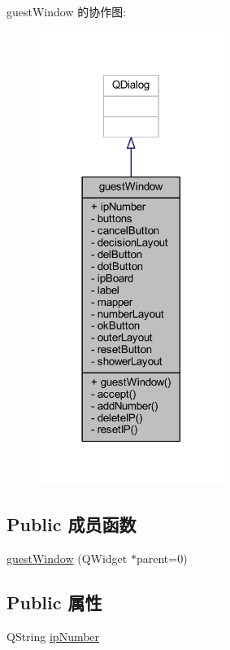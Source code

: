 guest\+Window 的协作图\+:
\nopagebreak
\begin{figure}[H]
\begin{center}
\leavevmode
\includegraphics[width=170pt]{d8/d31/classguest_window__coll__graph}
\end{center}
\end{figure}
\subsection*{Public 成员函数}
\begin{DoxyCompactItemize}
\item 
\hyperlink{classguest_window_a969632c10abd2956bcc4187752b0a786_a969632c10abd2956bcc4187752b0a786}{guest\+Window} (Q\+Widget $\ast$parent=0)
\end{DoxyCompactItemize}
\subsection*{Public 属性}
\begin{DoxyCompactItemize}
\item 
Q\+String \hyperlink{classguest_window_aec5de0ba4a85a700539206dacb373722_aec5de0ba4a85a700539206dacb373722}{ip\+Number}
\end{DoxyCompactItemize}

